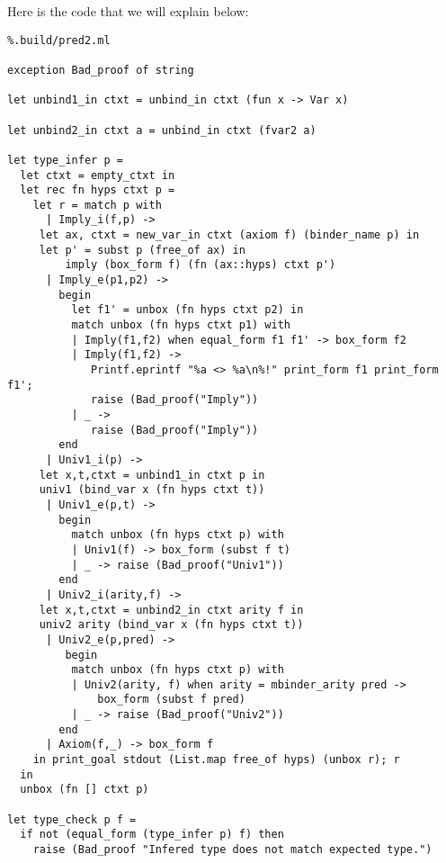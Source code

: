 \documentclass[11pt]{article}
\begin{document}
Here is the code that we will explain below:
\begin{lstlisting}%.build/pred2.ml

exception Bad_proof of string

let unbind1_in ctxt = unbind_in ctxt (fun x -> Var x)

let unbind2_in ctxt a = unbind_in ctxt (fvar2 a)

let type_infer p =
  let ctxt = empty_ctxt in
  let rec fn hyps ctxt p =
    let r = match p with
      | Imply_i(f,p) ->
	 let ax, ctxt = new_var_in ctxt (axiom f) (binder_name p) in
	 let p' = subst p (free_of ax) in
         imply (box_form f) (fn (ax::hyps) ctxt p')
      | Imply_e(p1,p2) ->
        begin
          let f1' = unbox (fn hyps ctxt p2) in
          match unbox (fn hyps ctxt p1) with
          | Imply(f1,f2) when equal_form f1 f1' -> box_form f2
          | Imply(f1,f2) ->
             Printf.eprintf "%a <> %a\n%!" print_form f1 print_form f1';
             raise (Bad_proof("Imply"))
          | _ ->
             raise (Bad_proof("Imply"))
        end
      | Univ1_i(p) ->
	 let x,t,ctxt = unbind1_in ctxt p in
	 univ1 (bind_var x (fn hyps ctxt t))
      | Univ1_e(p,t) ->
        begin
          match unbox (fn hyps ctxt p) with
          | Univ1(f) -> box_form (subst f t)
          | _ -> raise (Bad_proof("Univ1"))
        end
      | Univ2_i(arity,f) ->
	 let x,t,ctxt = unbind2_in ctxt arity f in
	 univ2 arity (bind_var x (fn hyps ctxt t))
      | Univ2_e(p,pred) ->
         begin
          match unbox (fn hyps ctxt p) with
          | Univ2(arity, f) when arity = mbinder_arity pred ->
              box_form (subst f pred)
          | _ -> raise (Bad_proof("Univ2"))
        end
      | Axiom(f,_) -> box_form f
    in print_goal stdout (List.map free_of hyps) (unbox r); r
  in
  unbox (fn [] ctxt p)

let type_check p f =
  if not (equal_form (type_infer p) f) then
    raise (Bad_proof "Infered type does not match expected type.")
\end{lstlisting}
\end{document}
